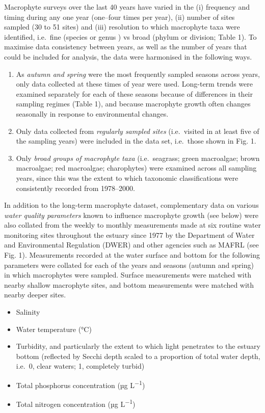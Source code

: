 \documentclass[
]{book}
\begin{document}
Macrophyte surveys over the last 40 years have varied in the (i) frequency and timing during any one year (one--four times per year), (ii) number of sites sampled (30 to 51 sites) and (iii) resolution to which macrophyte taxa were identified, i.e.~fine (species or genus ) vs broad (phylum or division; Table 1). To maximise data consistency between years, as well as the number of years that could be included for analysis, the data were harmonised in the following ways.

\begin{enumerate}
\def\labelenumi{\arabic{enumi}.}
\item
  As \emph{autumn and spring} were the most frequently sampled seasons across years, only data collected at these times of year were used. Long-term trends were examined separately for each of these seasons because of differences in their sampling regimes (Table 1), and because macrophyte growth often changes seasonally in response to environmental changes.
\item
  Only data collected from \emph{regularly sampled sites} (i.e.~visited in at least five of the sampling years) were included in the data set, i.e.~those shown in Fig. 1.
\item
  Only \emph{broad groups of macrophyte taxa} (i.e.~seagrass; green macroalgae; brown macroalgae; red macroalgae; charophytes) were examined across all sampling years, since this was the extent to which taxonomic classifications were consistently recorded from 1978--2000.
\end{enumerate}

In addition to the long-term macrophyte dataset, complementary data on various \emph{water quality parameters} known to influence macrophyte growth (see below) were also collated from the weekly to monthly measurements made at six routine water monitoring sites throughout the estuary since 1977 by the Department of Water and Environmental Regulation (DWER) and other agencies such as MAFRL (see Fig. 1). Measurements recorded at the water surface and bottom for the following parameters were collated for each of the years and seasons (autumn and spring) in which macrophytes were sampled. Surface measurements were matched with nearby shallow macrophyte sites, and bottom measurements were matched with nearby deeper sites.

\begin{itemize}
\item
  Salinity
\item
  Water temperature (°C)
\item
  Turbidity, and particularly the extent to which light penetrates to the estuary bottom (reflected by Secchi depth scaled to a proportion of total water depth, i.e.~0, clear waters; 1, completely turbid)
\item
  Total phosphorus concentration (µg L\textsuperscript{−1})~~~~
\item
  Total nitrogen concentration (µg L\textsuperscript{−1})
\end{itemize}
\end{document}
